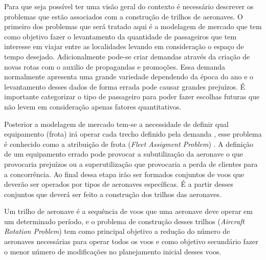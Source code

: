Para que seja possível ter uma visão geral do contexto é necessário descrever os
problemas que estão associados com a construção de trilhos de aeronaves. O
primeiro dos problemas que será tratado aqui é a modelagem de mercado que tem
como objetivo fazer o levantamento da quantidade de passageiros que tem
interesse em viajar entre as localidades levando em consideração o espaço de
tempo desejado. Adicionalmente pode-se criar demandas através da criação de
novas rotas com o auxilio de propagandas e promoções. Essa demanda normalmente
apresenta uma grande variedade dependendo da época do ano e o levantamento desses dados de forma errada pode
causar grandes prejuízos. É importante categorizar o tipo de passageiro para
poder fazer escolhas futuras que não levem em consideração apenas fatores
quantitativos.

Posterior a modelagem de mercado tem-se a necessidade de definir qual
equipamento (frota) irá operar cada trecho definido pela
demanda \cite{pimentel2005}, esse problema é conhecido como a atribuição de
frota (\textit{Fleet Assigment Problem}) . A definição de um equipamento errado
pode provocar a subutilização da aeronave o que provocaria prejuízos ou a
superutilização que provocaria a perda de clientes para a
concorrência. Ao final dessa etapa irão ser formados
conjuntos de voos que deverão ser operados por tipos de aeronaves específicas. É a partir desses conjuntos que deverá ser feito a
construção dos trilhos das aeronaves.

Um trilho de aeronave é a sequência de voos que uma aeronave deve operar em um
determinado período, e o problema de construção desses trilhos 
(\textit{Aircraft Rotation Problem}) tem como principal objetivo a
redução do número de aeronaves necessárias para operar todos os voos e como
objetivo secundário fazer o menor número de modificações no planejamento inicial desses
voos.

